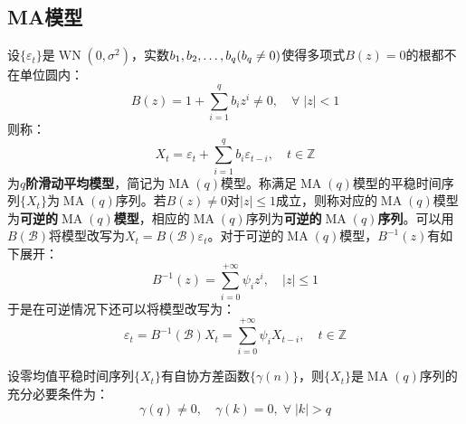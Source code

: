\subsection{MA模型}
\begin{definition}
	设$\{\varepsilon_t\}$是$\operatorname{WN}(0,\sigma^2)$，实数$b_1, b_2, \dots, b_{q}(b_q\ne0)$使得多项式$B(z)=0$的根都不在单位圆内：
	\begin{equation*}
		B(z)=1+\sum_{i=1}^{q}b_iz^i\ne0,\quad\forall\;|z|<1
	\end{equation*}
	则称：
	\begin{equation*}
		X_t=\varepsilon_t+\sum_{i=1}^{q}b_i\varepsilon_{t-i},\quad t\in\mathbb{Z}
	\end{equation*}
	为\textbf{$q$阶滑动平均模型}，简记为$\operatorname{MA}(q)$模型。称满足$\operatorname{MA}(q)$模型的平稳时间序列$\{X_t\}$为$\operatorname{MA}(q)$序列。若$B(z)\ne0$对$|z|\leqslant1$成立，则称对应的$\operatorname{MA}(q)$模型为\textbf{可逆的$\operatorname{MA}(q)$模型}，相应的$\operatorname{MA}(q)$序列为\textbf{可逆的$\operatorname{MA}(q)$序列}。可以用$B(\mathcal{B})$将模型改写为$X_t=B(\mathcal{B})\varepsilon_t$。对于可逆的$\operatorname{MA}(q)$模型，$B^{-1}(z)$有如下展开：
	\begin{equation*}
		B^{-1}(z)=\sum_{i=0}^{+\infty}\psi_iz^i,\quad |z|\leqslant1
	\end{equation*}
	于是在可逆情况下还可以将模型改写为：
	\begin{equation*}
		\varepsilon_t=B^{-1}(\mathcal{B})X_t=\sum_{i=0}^{+\infty}\psi_iX_{t-i},\quad t\in\mathbb{Z}
	\end{equation*}
\end{definition}
\begin{theorem}
	设零均值平稳时间序列$\{X_t\}$有自协方差函数$\{\gamma(n)\}$，则$\{X_t\}$是$\operatorname{MA}(q)$序列的充分必要条件为：
	\begin{equation*}
		\gamma(q)\ne 0,\quad\gamma(k)=0,\;\forall\;|k|>q
	\end{equation*}
\end{theorem}
